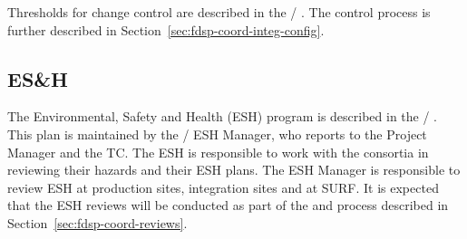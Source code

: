 Thresholds for change control are described in the
/ . The control process is further
described in Section~\ref{sec:fdsp-coord-integ-config}.

\subsection{ES\&H}
\label{sec:fdsp-coord-esh}

The  Environmental, Safety and Health (ESH) program is
described in the / . This plan is
maintained by the / ESH Manager, who reports
to the  Project Manager and the TC. The ESH is responsible
to work with the consortia in reviewing their hazards and their ESH
plans.  The ESH Manager is responsible to review ESH at production
sites, integration sites and at SURF. It is expected that the ESH
reviews will be conducted as part of the  and  process described
in Section~\ref{sec:fdsp-coord-reviews}.
